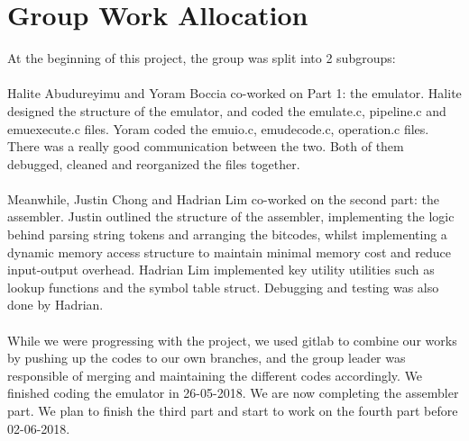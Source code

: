 \documentclass[a4paper]{article}
\begin{document}
\newpage



\section{Group Work Allocation}
At the beginning of this project, the group was split into 2 subgroups:\\ \\
Halite Abudureyimu and Yoram Boccia co-worked on Part 1: the emulator. Halite designed the structure of the emulator, and coded the emulate.c, pipeline.c and emuexecute.c files. Yoram coded the emuio.c, emudecode.c, operation.c files. There was a really good communication between the two. Both of them debugged, cleaned and reorganized the files together.
\\\\
Meanwhile, Justin Chong and Hadrian Lim co-worked on the second part: the assembler. Justin outlined the structure of the assembler, implementing the logic behind parsing string tokens and arranging the bitcodes, whilst implementing a dynamic memory access structure to maintain minimal memory cost and reduce input-output overhead. Hadrian Lim implemented key utility utilities such as lookup functions and the symbol table struct. Debugging and testing was also done by Hadrian. 
\\\\
While we were progressing with the project, we used gitlab to combine our works by pushing up the codes to our own branches, and the group leader was responsible of merging and maintaining the different codes accordingly. We finished coding the emulator in 26-05-2018. We are now completing the assembler part. We plan to finish the third part and start to work on the fourth part before 02-06-2018.
\end{document}
